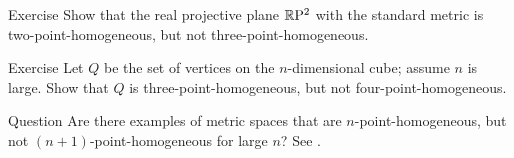 {\sloppy

\begin{thm}{Exercise}\label{ex:RP-not}
Show that the real projective plane $\mathbb{R}\mathrm{P}^2$ with the standard metric is two-point-homogeneous, but not three-point-homogeneous.
\end{thm}

}

\begin{thm}{Exercise}\label{ex:hom-cube}
Let $Q$ be the set of vertices on the $n$-dimensional cube;
assume $n$ is large.
Show that $Q$ is three-point-homogeneous, but not four-point-homogeneous.
\end{thm}

\begin{thm}{Question}
Are there examples of metric spaces that are $n$-point-homogeneous, but not $(n+1)$-point-homogeneous for large $n$? See \cite{petrunin-431426}.
\end{thm}
